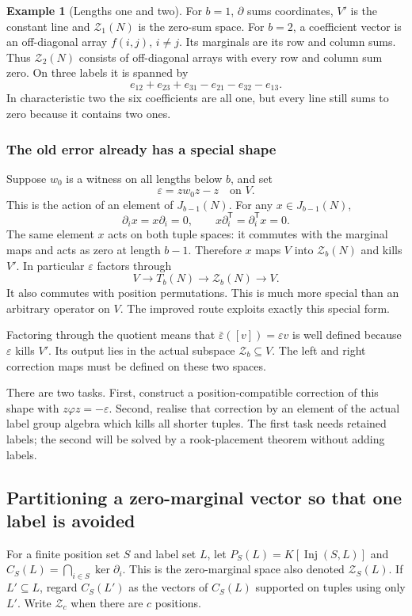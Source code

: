 \documentclass[11pt,a4paper]{article}
\theoremstyle{definition}\newtheorem{definition}[theorem]{Definition}
\newtheorem{example}[theorem]{Example}
\theoremstyle{remark}\newtheorem{remark}[theorem]{Remark}
\DeclareMathOperator{\Inj}{Inj}
\begin{document}
\begin{example}[Lengths one and two]
For $b=1$, $\partial$ sums coordinates, $V'$ is the constant line and $\mathcal Z_1(N)$ is the zero-sum space. For $b=2$, a coefficient vector is an off-diagonal array $f(i,j)$, $i\ne j$. Its marginals are its row and column sums. Thus $\mathcal Z_2(N)$ consists of off-diagonal arrays with every row and column sum zero. On three labels it is spanned by
\[e_{12}+e_{23}+e_{31}-e_{21}-e_{32}-e_{13}.
\]
In characteristic two the six coefficients are all one, but every line still sums to zero because it contains two ones.
\end{example}

\subsubsection{The old error already has a special shape}
Suppose $w_0$ is a witness on all lengths below $b$, and set
\[\varepsilon=zw_0z-z\quad\text{on }V.\]
This is the action of an element of $J_{b-1}(N)$. For any $x\in J_{b-1}(N)$,
\[\partial_i x=x\partial_i=0,\qquad x\partial_i^{\mathsf T}=\partial_i^{\mathsf T}x=0.
\]
The same element $x$ acts on both tuple spaces: it commutes with the
marginal maps and acts as zero at length $b-1$.
Therefore $x$ maps $V$ into $\mathcal Z_b(N)$ and kills $V'$. In particular $\varepsilon$ factors through
\[V\longrightarrow T_b(N)\longrightarrow \mathcal Z_b(N)\longrightarrow V.
\]
It also commutes with position permutations. This is much more special than an arbitrary operator on $V$. The improved route exploits exactly this special form.

Factoring through the quotient means that
$\bar\varepsilon([v])=\varepsilon v$ is well defined because
$\varepsilon$ kills $V'$. Its output lies in the actual subspace
$\mathcal Z_b\subseteq V$. The left and right correction maps must
be defined on these two spaces.

There are two tasks. First, construct a position-compatible correction of this shape with $z\varphi z=-\varepsilon$. Second, realise that correction by an element of the actual label group algebra which kills all shorter tuples. The first task needs retained labels; the second will be solved by a rook-placement theorem without adding labels.

\subsection{Partitioning a zero-marginal vector so that one label is avoided}\label{sec:partition}
For a finite position set $S$ and label set $L$, let $P_S(L)=K[\Inj(S,L)]$ and $C_S(L)=\bigcap_{i\in S}\ker\partial_i$. This is the zero-marginal space also denoted $\mathcal Z_S(L)$. If $L'\subseteq L$, regard $C_S(L')$ as the vectors of $C_S(L)$ supported on tuples using only $L'$. Write $\mathcal Z_c$ when there are $c$ positions.
\end{document}
